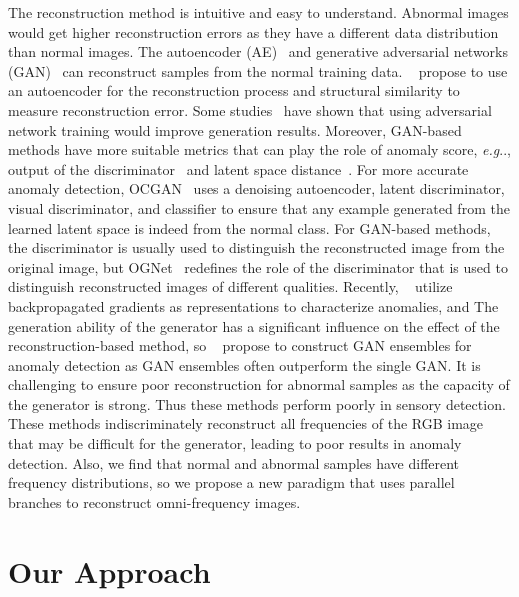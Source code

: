 \documentclass[lettersize,journal]{IEEEtran}
\makeatletter
\DeclareRobustCommand\onedot{\futurelet\@let@token\@onedot}
\def\@onedot{\ifx\@let@token.\else.\null\fi\xspace}
\def\eg{\emph{e.g}\onedot} \def\Eg{\emph{E.g}\onedot}
\makeatother
\begin{document}
 The reconstruction method is intuitive and easy to understand. Abnormal images would get higher reconstruction errors as they have a different data distribution than normal images. The autoencoder (AE)~\cite{kingma2014auto} and generative adversarial networks (GAN)~\cite{goodfellow2014generative} can reconstruct samples from the normal training data. ~\cite{bergmann2018improving} propose to use an autoencoder for the reconstruction process and structural similarity to measure reconstruction error. Some studies~\cite{goodfellow2014generative, pathak2016context} have shown that using adversarial network training would improve generation results. Moreover, GAN-based methods have more suitable metrics that can play the role of anomaly score, \eg, output of the discriminator~\cite{sabokrou2018adversarially, akcay2018ganomaly} and latent space distance~\cite{abati2019latent, akcay2018ganomaly, akccay2019skip}.  For more accurate anomaly detection, OCGAN~\cite{perera2019ocgan} uses a denoising autoencoder, latent discriminator, visual discriminator, and classifier to ensure that any example generated from the learned latent space is indeed from the normal class. For GAN-based methods, the discriminator is usually used to distinguish the reconstructed image from the original image, but OGNet~\cite{zaheer2020old} redefines the role of the discriminator that is used to distinguish reconstructed images of different qualities. Recently, ~\cite{kwon2020backpropagated} utilize backpropagated gradients as representations to characterize anomalies, and The generation ability of the generator has a significant influence on the effect of the reconstruction-based method, so ~\cite{han2021gan} propose to construct GAN ensembles for anomaly detection as GAN ensembles often outperform the single GAN. It is challenging to ensure poor reconstruction for abnormal samples as the capacity of the generator is strong. Thus these methods perform poorly in sensory detection. These methods indiscriminately reconstruct all frequencies of the RGB image that may be difficult for the generator, leading to poor results in anomaly detection. Also, we find that normal and abnormal samples have different frequency distributions, so we propose a new paradigm that uses parallel branches to reconstruct omni-frequency images.

\section{Our Approach}\label{sec:our_approach}
\end{document}
